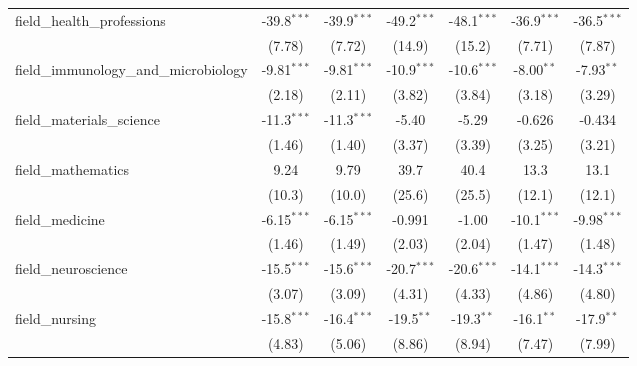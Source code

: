 \begin{tabular}{lcccccc}
   field\_health\_professions                                  & -39.8$^{***}$ & -39.9$^{***}$ & -49.2$^{***}$ & -48.1$^{***}$ & -36.9$^{***}$ & -36.5$^{***}$\\   
                                                               & (7.78)        & (7.72)        & (14.9)        & (15.2)        & (7.71)        & (7.87)\\   
   field\_immunology\_and\_microbiology                        & -9.81$^{***}$ & -9.81$^{***}$ & -10.9$^{***}$ & -10.6$^{***}$ & -8.00$^{**}$  & -7.93$^{**}$\\   
                                                               & (2.18)        & (2.11)        & (3.82)        & (3.84)        & (3.18)        & (3.29)\\   
   field\_materials\_science                                   & -11.3$^{***}$ & -11.3$^{***}$ & -5.40         & -5.29         & -0.626        & -0.434\\   
                                                               & (1.46)        & (1.40)        & (3.37)        & (3.39)        & (3.25)        & (3.21)\\   
   field\_mathematics                                          & 9.24          & 9.79          & 39.7          & 40.4          & 13.3          & 13.1\\   
                                                               & (10.3)        & (10.0)        & (25.6)        & (25.5)        & (12.1)        & (12.1)\\   
   field\_medicine                                             & -6.15$^{***}$ & -6.15$^{***}$ & -0.991        & -1.00         & -10.1$^{***}$ & -9.98$^{***}$\\   
                                                               & (1.46)        & (1.49)        & (2.03)        & (2.04)        & (1.47)        & (1.48)\\   
   field\_neuroscience                                         & -15.5$^{***}$ & -15.6$^{***}$ & -20.7$^{***}$ & -20.6$^{***}$ & -14.1$^{***}$ & -14.3$^{***}$\\   
                                                               & (3.07)        & (3.09)        & (4.31)        & (4.33)        & (4.86)        & (4.80)\\   
   field\_nursing                                              & -15.8$^{***}$ & -16.4$^{***}$ & -19.5$^{**}$  & -19.3$^{**}$  & -16.1$^{**}$  & -17.9$^{**}$\\   
                                                               & (4.83)        & (5.06)        & (8.86)        & (8.94)        & (7.47)        & (7.99)\\   

\end{tabular}
